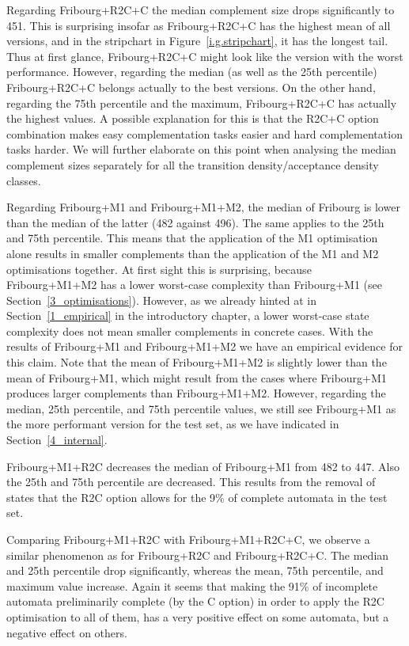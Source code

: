 Regarding Fribourg+R2C+C the median complement size drops significantly to 451. This is surprising insofar as Fribourg+R2C+C has the highest mean of all versions, and in the stripchart in Figure~\ref{i.g.stripchart}, it has the longest tail. Thus at first glance, Fribourg+R2C+C might look like the version with the worst performance. However, regarding the median (as well as the 25th percentile) Fribourg+R2C+C belongs actually to the best versions. On the other hand, regarding the 75th percentile and the maximum, Fribourg+R2C+C has actually the highest values. A possible explanation for this is that the R2C+C option combination makes easy complementation tasks easier and hard complementation tasks harder. We will further elaborate on this point when analysing the median complement sizes separately for all the transition density/acceptance density classes. 

Regarding Fribourg+M1 and Fribourg+M1+M2, the median of Fribourg is lower than the median of the latter (482 against 496). The same applies to the 25th and 75th percentile. This means that the application of the M1 optimisation alone results in smaller complements than the application of the M1 and M2 optimisations together. At first sight this is surprising, because Fribourg+M1+M2 has a lower worst-case complexity than Fribourg+M1 (see Section~\ref{3_optimisations}). However, as we already hinted at in Section~\ref{1_empirical} in the introductory chapter, a lower worst-case state complexity does not mean smaller complements in concrete cases. With the results of Fribourg+M1 and Fribourg+M1+M2 we have an empirical evidence for this claim. Note that the mean of Fribourg+M1+M2 is slightly lower than the mean of Fribourg+M1, which might result from the cases where Fribourg+M1 produces larger complements than Fribourg+M1+M2. However, regarding the median, 25th percentile, and 75th percentile values, we still see Fribourg+M1 as the more performant version for the \goal{} test set, as we have indicated in Section~\ref{4_internal}.

Fribourg+M1+R2C decreases the median of Fribourg+M1 from 482 to 447. Also the 25th and 75th percentile are decreased. This results from the removal of states that the R2C option allows for the 9\% of complete automata in the \goal{} test set.

Comparing Fribourg+M1+R2C with Fribourg+M1+R2C+C, we observe a similar phenomenon as for Fribourg+R2C and Fribourg+R2C+C. The median and 25th percentile drop significantly, whereas the mean, 75th percentile, and maximum value increase. Again it seems that making the 91\% of incomplete automata preliminarily complete (by the C option) in order to apply the R2C optimisation to all of them, has a very positive effect on some automata, but a negative effect on others.

